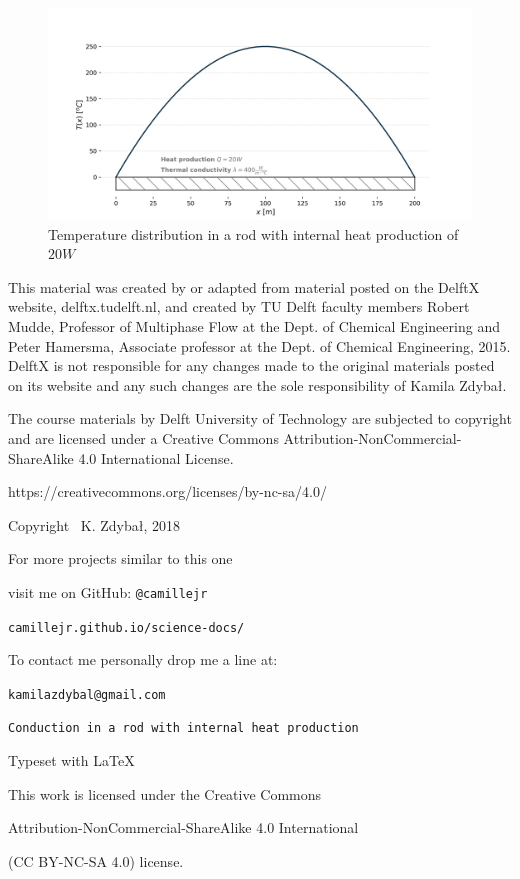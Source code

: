 \documentclass[10pt]{article}
\begin{document}
\begin{figure}[H]
\centering\includegraphics[width=18cm]{temperature_distribution.png}
\caption{Temperature distribution in a rod with internal heat production of $20 W$}
\label{fig:learning_curve}
\end{figure}



\newpage

\thispagestyle{empty}


This material was created by or adapted from material posted on the DelftX website, delftx.tudelft.nl, and created by TU Delft faculty members Robert Mudde, Professor of Multiphase Flow at the Dept. of Chemical Engineering and Peter Hamersma, Associate professor at the Dept. of Chemical Engineering, 2015. DelftX is not responsible for any changes made to the original materials posted on its website and any such changes are the sole responsibility of Kamila Zdybał.

The course materials by Delft University of Technology are subjected to copyright and are licensed under a Creative Commons Attribution-NonCommercial-ShareAlike 4.0 International License.

https://creativecommons.org/licenses/by-nc-sa/4.0/

\begin{center}
\vspace*{7cm}

\setlength{\parskip}{0.0em}
\setlength{\parindent}{0cm}

Copyright \textcopyright \, K. Zdybał, 2018

For more projects similar to this one

visit me on GitHub: \verb|@camillejr|

\verb|camillejr.github.io/science-docs/|

To contact me personally drop me a line at:

\verb|kamilazdybal@gmail.com|

\vspace*{2cm}

\verb|Conduction in a rod with internal heat production|

Typeset with \LaTeX

\vspace*{1.8cm}

\noindent This work is licensed under the Creative Commons

Attribution-NonCommercial-ShareAlike 4.0 International 

(CC BY-NC-SA
4.0) license.
\end{center}
\end{document}
